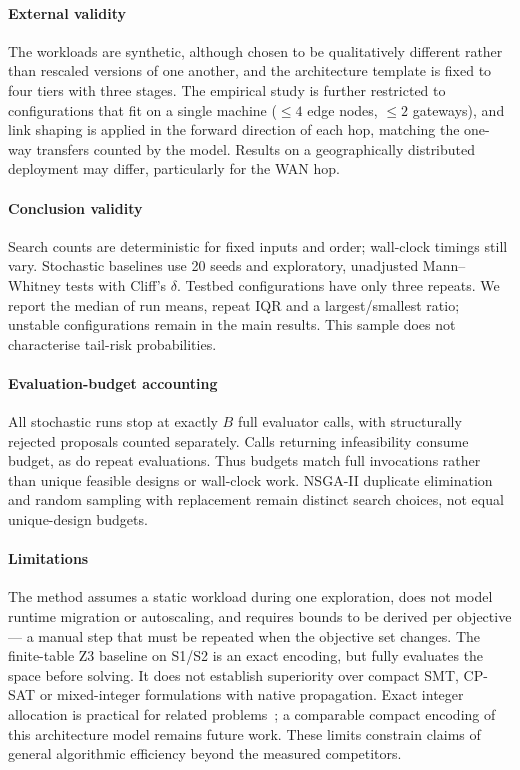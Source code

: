 \paragraph{External validity}
The workloads are synthetic, although chosen to be qualitatively different rather than
rescaled versions of one another, and the architecture template is fixed to four tiers
with three stages. The empirical study is further restricted to configurations that fit on
a single machine ($\le4$ edge nodes, $\le2$ gateways), and link shaping is applied in the
forward direction of each hop, matching the one-way transfers counted by the model. Results
on a geographically distributed deployment may differ, particularly for the WAN hop.

\paragraph{Conclusion validity}
Search counts are deterministic for fixed inputs and order; wall-clock timings still
vary. Stochastic baselines use 20 seeds and exploratory, unadjusted Mann--Whitney tests
with Cliff's $\delta$. Testbed configurations have only three repeats. We report the
median of run means, repeat IQR and a largest/smallest ratio; unstable configurations
remain in the main results. This sample does not characterise tail-risk probabilities.

\paragraph{Evaluation-budget accounting}
All stochastic runs stop at exactly $B$ full evaluator calls, with structurally rejected
proposals counted separately. Calls returning infeasibility consume budget, as do repeat
evaluations. Thus budgets match full invocations rather than unique feasible designs or
wall-clock work. NSGA-II duplicate elimination and random sampling with replacement
remain distinct search choices, not equal unique-design budgets.

\paragraph{Limitations}
The method assumes a static workload during one exploration, does not model runtime
migration or autoscaling, and requires bounds to be derived per objective --- a manual
step that must be repeated when the objective set changes. The finite-table Z3 baseline on S1/S2 is an exact encoding, but fully evaluates the space
before solving. It does not establish superiority over compact SMT, CP-SAT or mixed-integer
formulations with native propagation. Exact integer allocation is practical for related
problems~\cite{kouloumpris2024optimization,kouloumpris2026reliability}; a comparable
compact encoding of this architecture model remains future work. These limits constrain
claims of general algorithmic efficiency beyond the measured competitors.
